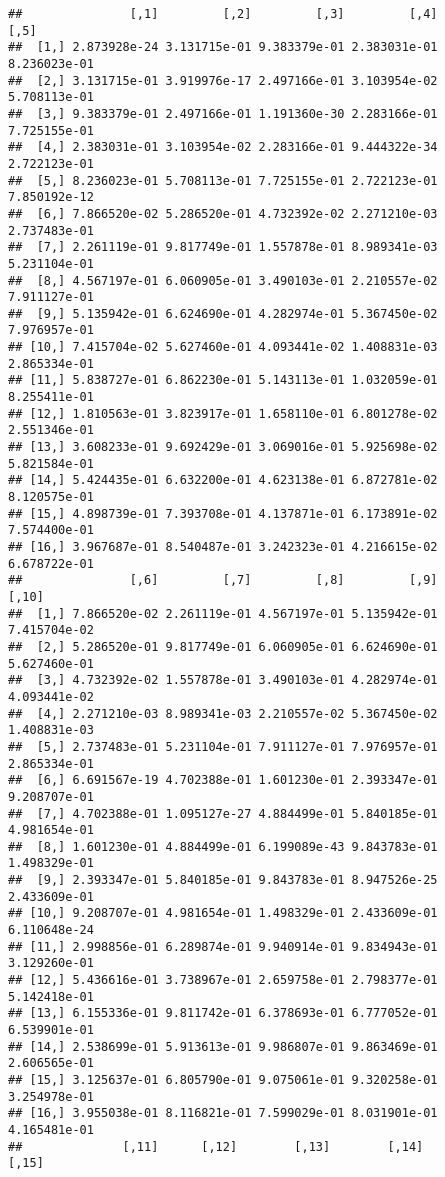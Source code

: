 \documentclass[
]{article}
\begin{document}
\begin{verbatim}
##               [,1]         [,2]         [,3]         [,4]         [,5]
##  [1,] 2.873928e-24 3.131715e-01 9.383379e-01 2.383031e-01 8.236023e-01
##  [2,] 3.131715e-01 3.919976e-17 2.497166e-01 3.103954e-02 5.708113e-01
##  [3,] 9.383379e-01 2.497166e-01 1.191360e-30 2.283166e-01 7.725155e-01
##  [4,] 2.383031e-01 3.103954e-02 2.283166e-01 9.444322e-34 2.722123e-01
##  [5,] 8.236023e-01 5.708113e-01 7.725155e-01 2.722123e-01 7.850192e-12
##  [6,] 7.866520e-02 5.286520e-01 4.732392e-02 2.271210e-03 2.737483e-01
##  [7,] 2.261119e-01 9.817749e-01 1.557878e-01 8.989341e-03 5.231104e-01
##  [8,] 4.567197e-01 6.060905e-01 3.490103e-01 2.210557e-02 7.911127e-01
##  [9,] 5.135942e-01 6.624690e-01 4.282974e-01 5.367450e-02 7.976957e-01
## [10,] 7.415704e-02 5.627460e-01 4.093441e-02 1.408831e-03 2.865334e-01
## [11,] 5.838727e-01 6.862230e-01 5.143113e-01 1.032059e-01 8.255411e-01
## [12,] 1.810563e-01 3.823917e-01 1.658110e-01 6.801278e-02 2.551346e-01
## [13,] 3.608233e-01 9.692429e-01 3.069016e-01 5.925698e-02 5.821584e-01
## [14,] 5.424435e-01 6.632200e-01 4.623138e-01 6.872781e-02 8.120575e-01
## [15,] 4.898739e-01 7.393708e-01 4.137871e-01 6.173891e-02 7.574400e-01
## [16,] 3.967687e-01 8.540487e-01 3.242323e-01 4.216615e-02 6.678722e-01
##               [,6]         [,7]         [,8]         [,9]        [,10]
##  [1,] 7.866520e-02 2.261119e-01 4.567197e-01 5.135942e-01 7.415704e-02
##  [2,] 5.286520e-01 9.817749e-01 6.060905e-01 6.624690e-01 5.627460e-01
##  [3,] 4.732392e-02 1.557878e-01 3.490103e-01 4.282974e-01 4.093441e-02
##  [4,] 2.271210e-03 8.989341e-03 2.210557e-02 5.367450e-02 1.408831e-03
##  [5,] 2.737483e-01 5.231104e-01 7.911127e-01 7.976957e-01 2.865334e-01
##  [6,] 6.691567e-19 4.702388e-01 1.601230e-01 2.393347e-01 9.208707e-01
##  [7,] 4.702388e-01 1.095127e-27 4.884499e-01 5.840185e-01 4.981654e-01
##  [8,] 1.601230e-01 4.884499e-01 6.199089e-43 9.843783e-01 1.498329e-01
##  [9,] 2.393347e-01 5.840185e-01 9.843783e-01 8.947526e-25 2.433609e-01
## [10,] 9.208707e-01 4.981654e-01 1.498329e-01 2.433609e-01 6.110648e-24
## [11,] 2.998856e-01 6.289874e-01 9.940914e-01 9.834943e-01 3.129260e-01
## [12,] 5.436616e-01 3.738967e-01 2.659758e-01 2.798377e-01 5.142418e-01
## [13,] 6.155336e-01 9.811742e-01 6.378693e-01 6.777052e-01 6.539901e-01
## [14,] 2.538699e-01 5.913613e-01 9.986807e-01 9.863469e-01 2.606565e-01
## [15,] 3.125637e-01 6.805790e-01 9.075061e-01 9.320258e-01 3.254978e-01
## [16,] 3.955038e-01 8.116821e-01 7.599029e-01 8.031901e-01 4.165481e-01
##              [,11]      [,12]        [,13]        [,14]        [,15]

\end{verbatim}
\end{document}
